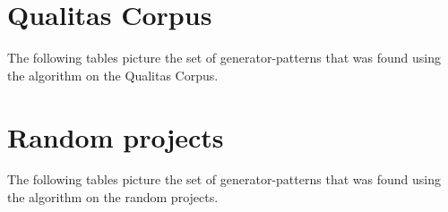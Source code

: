\cleardoublepage{}
\section{Qualitas Corpus}
The following tables picture the set of generator-patterns that was found using the algorithm on the Qualitas Corpus.




\cleardoublepage{}
\section{Random projects}
The following tables picture the set of generator-patterns that was found using the algorithm on the random projects.


